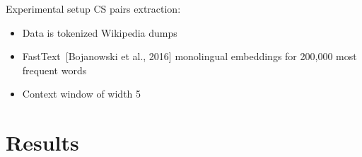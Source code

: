 \documentclass[english]{beamer}
\begin{document}
\begin{frame}{Experimental setup}
CS pairs extraction:
\begin{itemize}
	\item Data is tokenized Wikipedia dumps 
	\item FastText~{\footnotesize [Bojanowski et al., 2016]} monolingual embeddings for 200,000 most frequent words
	\item Context window of width 5
\end{itemize}
\vspace*{0.5cm}
\end{frame}

\section{Results}
\end{document}
